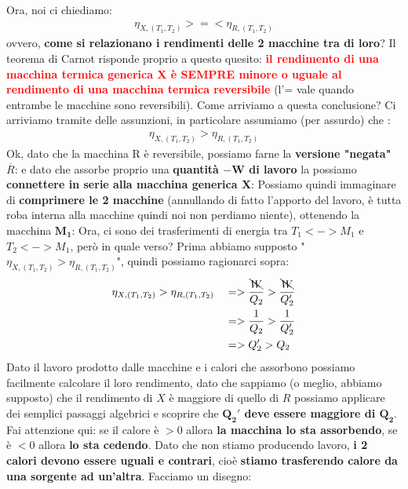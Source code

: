             Ora, noi ci chiediamo:
            \begin{align*}
                \eta_{X, (T_1, T_2)} >=< \eta_{R, (T_1, T_2)}
            \end{align*}
            ovvero, \textbf{come si relazionano i rendimenti delle 2 macchine tra di loro}? Il teorema di Carnot risponde proprio a questo quesito: \textcolor{Red}{\textbf{il rendimento di una macchina termica generica X è SEMPRE minore o uguale al rendimento di una macchina termica reversibile}} (l'= vale quando entrambe le macchine sono reversibili). Come arriviamo a questa conclusione? Ci arriviamo tramite delle assunzioni, in particolare assumiamo (per assurdo) che :
            \begin{align*}
                \eta_{X, (T_1, T_2)} > \eta_{R, (T_1, T_2)}
            \end{align*}
            Ok, dato che la macchina R è reversibile, possiamo farne la \textbf{versione "negata" $\overline{R}$}:
            e dato che assorbe proprio una \textbf{quantità $\mathbf{-W}$ di lavoro} la possiamo \textbf{connettere in serie alla macchina generica X}:
            Possiamo quindi immaginare di \textbf{comprimere le 2 macchine} (annullando di fatto l'apporto del lavoro, è tutta roba interna alla macchine quindi noi non perdiamo niente), ottenendo la macchina $\mathbf{M_1}$:
            Ora, ci sono dei trasferimenti di energia tra $T_1<->M_1$ e $T_2<->M_1$, però in quale verso? Prima abbiamo supposto "$\eta_{X, (T_1, T_2)} > \eta_{R, (T_1, T_2)}$", quindi possiamo ragionarci sopra:
            \begin{align*}
                &\eta_{X, (T_1, T_2)} > \eta_{R, (T_1, T_2)} &&=> \frac{\bcancel{W}}{Q_2} > \frac{\bcancel{W}}{Q_2'}\\
                & && =>\frac{1}{Q_2} > \frac{1}{Q_2'}\\
                & && =>Q_2' > Q_2\\
            \end{align*}
            Dato il lavoro prodotto dalle macchine e i calori che assorbono possiamo facilmente calcolare il loro rendimento, dato che sappiamo (o meglio, abbiamo supposto) che il rendimento di $X$ è maggiore di quello di $R$ possiamo applicare dei semplici passaggi algebrici e scoprire che \textbf{$\mathbf{Q_2'}$ deve essere maggiore di $\mathbf{Q_2}$}. Fai attenzione qui: se il calore è $> 0$ allora \textbf{la macchina lo sta assorbendo}, se è $< 0$ allora \textbf{lo sta cedendo}. Dato che non stiamo producendo lavoro, \textbf{i 2 calori devono essere uguali e contrari}, cioè \textbf{stiamo trasferendo calore da una sorgente ad un'altra}. Facciamo un disegno:
